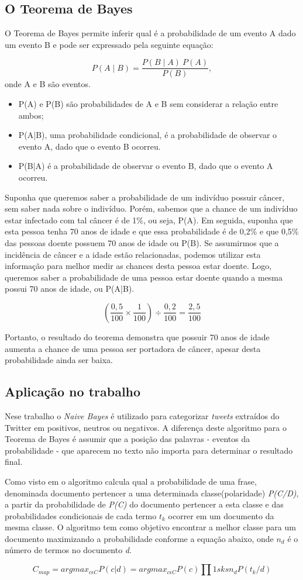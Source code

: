 \subsection{O Teorema de Bayes}

O Teorema de Bayes permite inferir qual é a probabilidade de um evento A dado um evento B e pode ser expressado pela seguinte equação:

$$ P(A \mid B) = \frac{P(B \mid A) \ P(A)}{P(B)}, $$
onde A e B são eventos.

\begin{itemize}
	\item P(A) e P(B) são probabilidades de A e B sem considerar a relação entre ambos;
	\item P(A|B), uma probabilidade condicional, é a probabilidade de observar o evento A, dado que o evento B ocorreu.
	\item P(B|A) é a probabilidade de observar o evento B, dado que o evento A ocorreu.
\end{itemize}

Suponha que queremos saber a probabilidade de um indivíduo possuir câncer, sem saber nada sobre o indivíduo. Porém, sabemos que a chance de um indivíduo estar infectado com tal câncer é de 1\%, ou seja, P(A).
Em seguida, suponha que esta pessoa tenha 70 anos de idade e que essa probabilidade é de 0,2\% e que 0,5\% das pessoas doente possuem 70 anos de idade ou P(B). Se assumirmos que a incidência de câncer e a idade estão relacionadas, podemos utilizar esta informação para melhor medir as chances desta pessoa estar doente. Logo, queremos saber a probabilidade de uma pessoa estar doente quando a mesma possui 70 anos de idade, ou P(A|B).

$$ (\frac{0,5}{100} \times \frac{1}{100}) \div \frac{0,2}{100} = \frac{2,5}{100} $$

Portanto, o resultado do teorema demonstra que possuir 70 anos de idade aumenta a chance de uma pessoa ser portadora de câncer, apesar desta probabilidade ainda ser baixa.

\subsection{Aplicação no trabalho}

Nese trabalho o \emph{Naive Bayes} é utilizado  para categorizar \textit{tweets} extraídos do Twitter em positivos, neutros ou negativos. A diferença deste algoritmo para o Teorema de Bayes é assumir que a posição das palavras - eventos da probabilidade - que aparecem no texto não importa para determinar o resultado final.

Como visto em \cite{lucca2013implementaccao} o algoritmo calcula qual a probabilidade de uma frase, denominada documento pertencer a uma determinada classe(polaridade) \emph{P(C/D)}, a partir da probabilidade de \emph{P(C)} do documento pertencer a esta classe e das probabilidades condicionais de cada termo $t_{k}$ ocorrer em um documento da mesma classe. O algoritmo tem como objetivo encontrar a melhor classe para um documento maximizando a probabilidade conforme a equação abaixo, onde $ n_{d} $ é o número de termos no documento \emph{d}. 

$$ C_{map}= argmax_{c \epsilon C}P(c|d)=argmax_{c \epsilon C}P(c)\prod 1sksn_{d}P(t_{k}/d) $$
